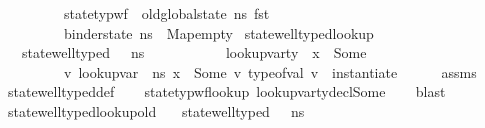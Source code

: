 \begin{isabellebody}
\ \ \ \ \ \ \ \ \ state{\isacharunderscore}{\kern0pt}typ{\isacharunderscore}{\kern0pt}wf\ {\isasymOmega}\ {\isacharparenleft}{\kern0pt}old{\isacharunderscore}{\kern0pt}global{\isacharunderscore}{\kern0pt}state\ ns{\isacharparenright}{\kern0pt}\ {\isacharparenleft}{\kern0pt}fst\ {\isasymLambda}{\isacharparenright}{\kern0pt}\ {\isasymand}\isanewline
\ \ \ \ \ \ \ \ \ {\isacharparenleft}{\kern0pt}binder{\isacharunderscore}{\kern0pt}state\ ns\ {\isacharequal}{\kern0pt}\ Map{\isachardot}{\kern0pt}empty{\isacharparenright}{\kern0pt}{\isachardoublequoteclose}\isanewline
\isanewline
{}\isamarkupfalse%
\ state{\isacharunderscore}{\kern0pt}well{\isacharunderscore}{\kern0pt}typed{\isacharunderscore}{\kern0pt}lookup{\isacharcolon}{\kern0pt}\ \isanewline
\ \ \ {\isachardoublequoteopen}state{\isacharunderscore}{\kern0pt}well{\isacharunderscore}{\kern0pt}typed\ {\isasymLambda}\ {\isasymOmega}\ ns{\isachardoublequoteclose}\ \isanewline
\ \ \ \ \ \ \ \ \ \ {\isachardoublequoteopen}lookup{\isacharunderscore}{\kern0pt}var{\isacharunderscore}{\kern0pt}ty\ {\isasymLambda}\ x\ {\isacharequal}{\kern0pt}\ Some\ {\isasymtau}{\isachardoublequoteclose}\ \ \ \ \ \ \ \ \ \ \isanewline
\ \ \ \ \ \ \ \ \ {\isachardoublequoteopen}{\isasymexists}v{\isachardot}{\kern0pt}\ lookup{\isacharunderscore}{\kern0pt}var\ {\isasymLambda}\ ns\ x\ {\isacharequal}{\kern0pt}\ Some\ v\ {\isasymand}type{\isacharunderscore}{\kern0pt}of{\isacharunderscore}{\kern0pt}val\ v\ {\isacharequal}{\kern0pt}\ instantiate\ {\isasymOmega}\ {\isasymtau}{\isachardoublequoteclose}\isanewline
%
\isadelimproof
\ \ %
\endisadelimproof
%
\isatagproof
{}\isamarkupfalse%
\ assms\isanewline
\ \ \isamarkupfalse%
\ state{\isacharunderscore}{\kern0pt}well{\isacharunderscore}{\kern0pt}typed{\isacharunderscore}{\kern0pt}def\isanewline
\ \ \isamarkupfalse%
\ state{\isacharunderscore}{\kern0pt}typ{\isacharunderscore}{\kern0pt}wf{\isacharunderscore}{\kern0pt}lookup\ lookup{\isacharunderscore}{\kern0pt}var{\isacharunderscore}{\kern0pt}ty{\isacharunderscore}{\kern0pt}decl{\isacharunderscore}{\kern0pt}Some\isanewline
\ \ \isamarkupfalse%
\ blast%
\endisatagproof
{\isafoldproof}%
%
\isadelimproof
\isanewline
%
\endisadelimproof
\isanewline
{}\isamarkupfalse%
\ state{\isacharunderscore}{\kern0pt}well{\isacharunderscore}{\kern0pt}typed{\isacharunderscore}{\kern0pt}lookup{\isacharunderscore}{\kern0pt}old{\isacharcolon}{\kern0pt}\isanewline
\ \ \ {\isachardoublequoteopen}state{\isacharunderscore}{\kern0pt}well{\isacharunderscore}{\kern0pt}typed\ {\isasymLambda}\ {\isasymOmega}\ ns{\isachardoublequoteclose}\ \isanewline

\end{isabellebody}
